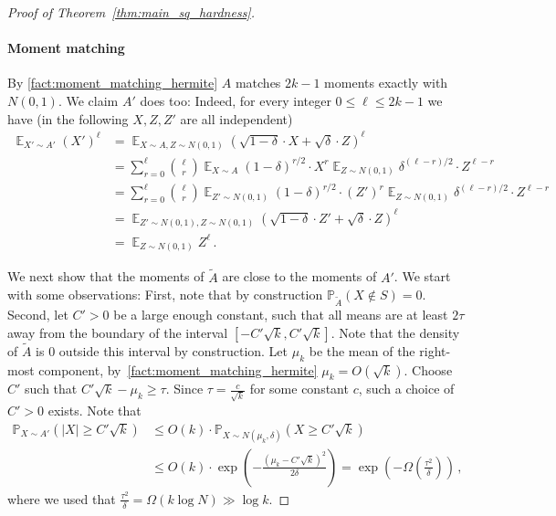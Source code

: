 \documentclass{theoretics}
\newcommand{\Paren}[1]{\left(#1\right)}
\newcommand{\Abs}[1]{\left\lvert#1\right\rvert}
\newcommand{\Esymb}{\mathbb{E}}
\newcommand{\Psymb}{\mathbb{P}}
\DeclareMathOperator*{\E}{\Esymb}
\renewcommand{\leq}{\leqslant}
\renewcommand{\geq}{\geqslant}
\begin{document}
\begin{proof}[Proof of Theorem~\ref{thm:main_sq_hardness}]
    \paragraph{Moment matching}
    By \cref{fact:moment_matching_hermite} $A$ matches $2k-1$ moments exactly with $N(0,1)$.
    We claim $A'$ does too: Indeed, for every integer $0 \leq \ell \leq 2k-1$ we have (in the following $X,Z,Z'$ are all independent)
    \begin{align*}
        \E_{X' \sim A'} (X')^\ell &= \E_{X \sim A, Z \sim N(0,1)}\Paren{ \sqrt{1-\delta}\cdot X + \sqrt{\delta} \cdot Z}^\ell \\
        &= \sum_{r = 0}^\ell \binom{\ell}{r} \E_{X \sim A}(1-\delta)^{r/2}\cdot X^r \E_{Z \sim N(0,1)}\delta^{(\ell - r)/2} \cdot Z^{\ell-r} \\
        &= \sum_{r = 0}^\ell \binom{\ell}{r} \E_{Z' \sim N(0,1)}(1-\delta)^{r/2}\cdot (Z')^r \E_{Z \sim N(0,1)}\delta^{(\ell - r)/2} \cdot Z^{\ell-r} \\
        &= \E_{Z' \sim N(0,1), Z \sim N(0,1)}\Paren{ \sqrt{1-\delta}\cdot Z' + \sqrt{\delta} \cdot Z}^\ell \\
        &= \E_{Z \sim N(0,1)} Z^\ell \,.
    \end{align*}

    We next show that the moments of $\tilde{A}$ are close to the moments of $A'$.
    We start with some observations:
    First, note that by construction $\Psymb_{\tilde{A}}(X \not\in S) = 0$.
    Second, let $C' > 0$ be a large enough constant, such that all means are at least $2\tau$ away from the boundary of the interval $[-C'\sqrt{k},C'\sqrt{k}]$.
    Note that the density of $\tilde{A}$ is 0 outside this interval by construction.
    Let $\mu_k$ be the mean of the right-most component, by~\cref{fact:moment_matching_hermite} $\mu_k = O(\sqrt{k})$.
    Choose $C'$ such that $C'\sqrt{k} - \mu_k \geq \tau$.
    Since $\tau = \tfrac c {\sqrt{k}}$ for some constant $c$, such a choice of $C' > 0$ exists.
    Note that
    \begin{align*}
        \Psymb_{X \sim A'}\Paren{\Abs{X} \geq C'\sqrt{k}}&\leq O(k)\cdot \Psymb_{X \sim N(\mu_k,\delta)}\Paren{X \geq C' \sqrt{k}} \\
        &\leq O(k) \cdot \exp\Paren{-\frac{\Paren{\mu_k - C'\sqrt{k}}^2}{2\delta}} = \exp\Paren{-\Omega\Paren{\frac{\tau^2}{\delta}}} \,,
    \end{align*}
    where we used that $\tfrac {\tau^2} \delta = \Omega(k \log N) \gg \log k$.
    


\end{proof}
\end{document}
